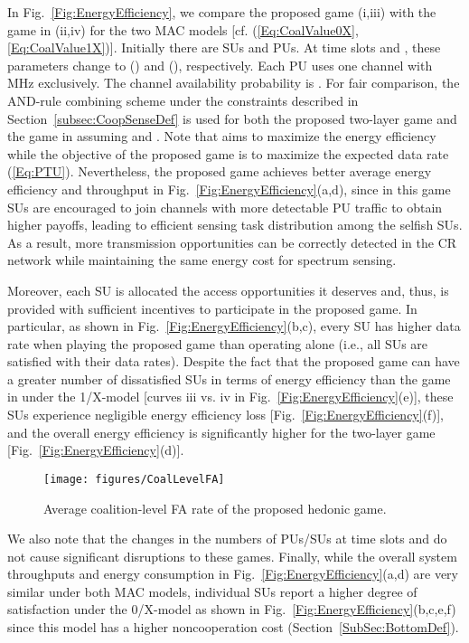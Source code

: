 \documentclass[journal,draftclsnofoot,onecolumn]{IEEEtran}
\theoremstyle{definition}
\def\FigScale{0.6}
\def\FigScale{0.65}
\begin{document}
In Fig.~\ref{Fig:EnergyEfficiency}, we compare the proposed game (i,iii) with the game in \cite{HedonicSenseGame} (ii,iv) for the two MAC models [cf. (\ref{Eq:CoalValue0X},\ref{Eq:CoalValue1X})]. Initially there are  SUs and  PUs. At time slots  and , these parameters change to () and (), respectively. Each PU uses one channel with \,MHz exclusively. The channel availability probability is . For fair comparison, the AND-rule combining scheme under the constraints described in Section~\ref{subsec:CoopSenseDef} is used for both the proposed two-layer game and the game in \cite{HedonicSenseGame} assuming  and . Note that \cite{HedonicSenseGame} aims to maximize the energy efficiency while the objective of the proposed game is to maximize the expected data rate (\ref{Eq:PTU}). Nevertheless, the proposed game achieves better average energy efficiency and throughput in Fig.~\ref{Fig:EnergyEfficiency}(a,d), since
in this game SUs are encouraged to join channels with more detectable PU traffic to obtain higher payoffs, leading to efficient sensing task distribution among the selfish SUs. As a result, more transmission opportunities can be correctly detected in the CR network while maintaining the same energy cost for spectrum sensing.

Moreover, each SU is allocated the access opportunities it deserves and, thus, is provided with sufficient incentives to participate in the proposed game. In particular, as shown in Fig.~\ref{Fig:EnergyEfficiency}(b,c), every SU has higher data rate when playing the proposed game than operating alone (i.e., all SUs are satisfied with their data rates). Despite the fact that the proposed game can have a greater number of dissatisfied SUs in terms of energy efficiency than the game in \cite{HedonicSenseGame} under the 1/X-model [curves iii vs. iv in Fig.~\ref{Fig:EnergyEfficiency}(e)], these SUs experience negligible energy efficiency loss [Fig.~\ref{Fig:EnergyEfficiency}(f)], and the overall energy efficiency is significantly higher for the two-layer game [Fig.~\ref{Fig:EnergyEfficiency}(d)]. 


\begin{figure}[!t]
    \centering
    \texttt{[image: figures/CoalLevelFA]}
    \caption{ Average coalition-level FA rate of the proposed hedonic game.}
    \label{Fig:CoalLevelFA}
\end{figure}

We also note that the changes in the numbers of PUs/SUs at time slots  and  do not cause significant disruptions to these games. Finally, while the overall system throughputs and energy consumption in Fig.~\ref{Fig:EnergyEfficiency}(a,d) are very similar under both MAC models, individual SUs report a higher degree of satisfaction under the 0/X-model as shown in Fig.~\ref{Fig:EnergyEfficiency}(b,c,e,f) since this model has a higher noncooperation cost (Section~\ref{SubSec:BottomDef}).
\end{document}
